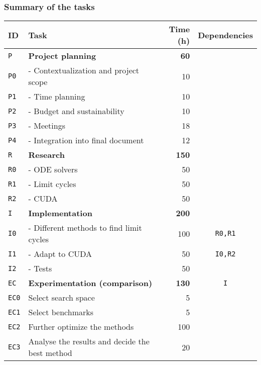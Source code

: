 \pagebreak
\subsubsection{Summary of the tasks}

\begin{table}[H]
    \centering
    \begin{tabular}{llrc}
        \toprule
        \textbf{ID} & \textbf{Task} & \textbf{Time (h)} & \textbf{Dependencies} \\
        \midrule
    \texttt{P} & \textbf{Project planning} & \textbf{60} & \\
        \texttt{P0} & - Contextualization and project scope & 10 & \\
        \texttt{P1} & - Time planning & 10 & \\
        \texttt{P2} & - Budget and sustainability & 10 & \\
        \texttt{P3} & - Meetings & 18 & \\
        \texttt{P4} & - Integration into final document & 12 & \\

        \addlinespace[0.5em]
    \texttt{R} & \textbf{Research} & \textbf{150} & \\
        \texttt{R0} & - ODE solvers & 50 & \\
        \texttt{R1} & - Limit cycles & 50 & \\
        \texttt{R2} & - CUDA & 50 & \\

        \addlinespace[0.5em]
    \texttt{I} & \textbf{Implementation} & \textbf{200} & \\
        \texttt{I0} & - Different methods to find limit cycles & 100 & \texttt{R0,R1} \\
        \texttt{I1} & - Adapt to CUDA & 50 & \texttt{I0,R2} \\
        \texttt{I2} & - Tests & 50 & \\

        \addlinespace[0.5em]
    \texttt{EC} & \textbf{Experimentation (comparison)} & \textbf{130} & \texttt{I} \\
        \texttt{EC0} & Select search space & 5 & \\
        \texttt{EC1} & Select benchmarks & 5 & \\
        \texttt{EC2} & Further optimize the methods & 100 & \\
        \texttt{EC3} & Analyse the results and decide the best method & 20 & \\


\end{tabular}
\end{table}
